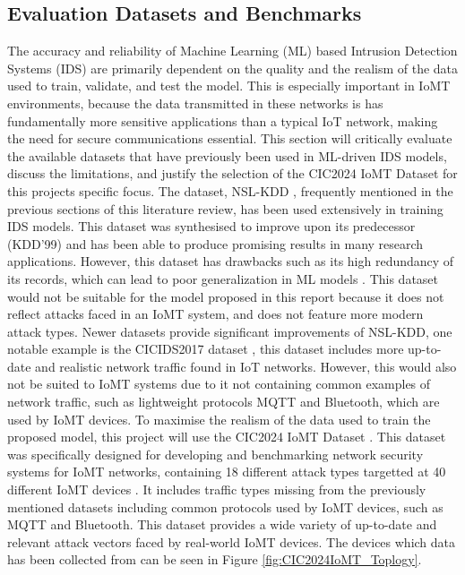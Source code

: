 \documentclass[11pt,a4paper]{article}
\begin{document}
\subsection{Evaluation Datasets and Benchmarks}
The accuracy and reliability of Machine Learning (ML) based Intrusion Detection Systems (IDS) are primarily dependent on the quality and the realism of the data used to train, validate, and test the model. This is especially important in IoMT environments, because the data transmitted in these networks is has fundamentally more sensitive applications than a typical IoT network, making the need for secure communications essential. This section will critically evaluate the available datasets that have previously been used in ML-driven IDS models, discuss the limitations, and justify the selection of the CIC2024 IoMT Dataset for this projects specific focus.
The dataset, NSL-KDD \cite{nslkdddataset}, frequently mentioned in the previous sections of this literature review, has been used extensively in training IDS models. This dataset was synthesised to improve upon its predecessor (KDD’99) \cite{kddanalysis} and has been able to produce promising results in many research applications. However, this dataset has drawbacks such as its high redundancy of its records, which can lead to poor generalization in ML models \cite{revathi2013detailed}. This dataset would not be suitable for the model proposed in this report because it does not reflect attacks faced in an IoMT system, and does not feature more modern attack types.
Newer datasets provide significant improvements of NSL-KDD, one notable example is the CICIDS2017 dataset \cite{cicids2017dataset}, this dataset includes more up-to-date and realistic network traffic found in IoT networks. However, this would also not be suited to IoMT systems due to it not containing common examples of network traffic, such as lightweight protocols MQTT and Bluetooth, which are used by IoMT devices. 
To maximise the realism of the data used to train the proposed model, this project will use the CIC2024 IoMT Dataset \cite{cic2024iomtdataset}. This dataset was specifically designed for developing and benchmarking network security systems for IoMT networks, containing 18 different attack types targetted at 40 different IoMT devices \cite{dadkhah2024ciciomt2024}. It includes traffic types missing from the previously mentioned datasets including common protocols used by IoMT devices, such as MQTT and Bluetooth. This dataset provides a wide variety of up-to-date and relevant attack vectors faced by real-world IoMT devices. The devices which data has been collected from can be seen in Figure \ref{fig:CIC2024IoMT_Toplogy}.
\end{document}
